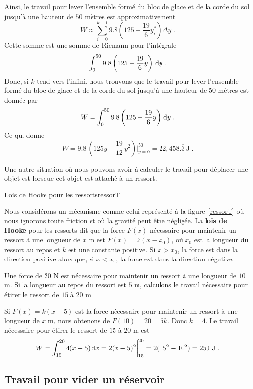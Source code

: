 {\begin{egg}
Ainsi, le travail pour lever l'ensemble formé du bloc de glace et de la corde
du sol jusqu'à une hauteur de $50$ mètres est approximativement
\[
W \approx \sum_{i=0}^{k-1} 9.8 \left(125-\frac{19}{6} y_i^\ast\right)
\Delta y \; .
\]
Cette somme est une somme de Riemann pour l'intégrale
\[
\int_0^{50} 9.8 \left(125-\frac{19}{6} y\right) \,\mathrm{d}y \; .
\]
Donc, si $k$ tend vers l'infini, nous trouvons que le travail pour lever
l'ensemble formé du bloc de glace et de la corde du sol jusqu'à une hauteur
de $50$ mètres est donnée par
\[
W = \int_0^{50} 9.8 \left(125-\frac{19}{6} y\right) \,\mathrm{d}y \; .
\]
Ce qui donne
\[
W = 9.8 \, \left(125y - \frac{19}{12}\,y^2\right)\bigg|_{y=0}^{50} =
22,458.\overline{3} \ \text{J} \; .
\]
\end{egg}

Une autre situation où nous pouvons avoir à calculer le travail pour déplacer
une objet est lorsque cet objet est attaché à un ressort.

{Lois de Hooke pour les ressorts}{ressorT}

Nous considérons un mécanisme comme celui représenté à la
figure~\ref{ressorT} où nous ignorons toute friction et où la gravité
peut être négligée.  La {\bfseries lois de Hooke}
pour les ressorts dit que la force $F(x)$ nécessaire pour maintenir un
ressort à une longueur de $x$ m est $F(x)= k (x-x_0)$, où $x_0$ est la
longueur du ressort au repos et $k$ est une constante positive.  Si
$x>x_0$, la force est dans la direction positive alors que, si
$x<x_0$, la force est dans la direction négative.

\begin{egg}
Une force de $20$ N est nécessaire pour maintenir un ressort à une longueur
de $10$ m.  Si la longueur au repos du ressort est $5$ m, calculons le
travail nécessaire pour étirer le ressort de $15$ à $20$ m.

Si $F(x) = k(x-5)$ est la force nécessaire pour maintenir un ressort à une
longueur de $x$ m, nous obtenons de $F(10) = 20 = 5k$.  Donc $k=4$.
Le travail nécessaire pour étirer le ressort de $15$ à $20$ m est
\[
W = \int_{15}^{20} 4(x-5) \,\mathrm{d}x = 2(x-5)^2\bigg|_{15}^{20}
= 2(15^2 - 10^2) = 250 \ \text{J} \ .
\]
\end{egg}

\subsection{Travail pour vider un réservoir}

}
